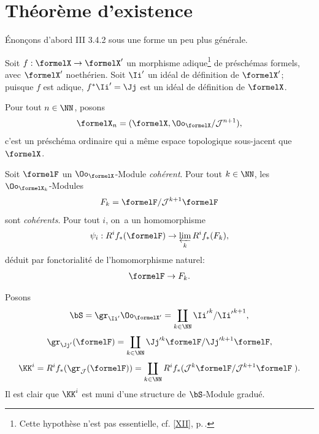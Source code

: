 \section{Th\'eor\`eme d'existence}

\'Enon\c cons d'abord \EGA III 3.4.2 sous une forme un peu plus
g\'en\'erale.

Soit $f:\formelX \to \formelX'$ un morphisme adique\footnote{Cette hypoth\`ese n'est pas essentielle, cf. \ref{XII}, p.\,\pageref{XII.14}.} de pr\'esch\'emas formels, avec $\formelX'$ noeth\'erien. Soit $\Ii'$ un id\'eal de d\'efinition de $\formelX'$; puisque $f$ est adique, $f^*\Ii'=\Jj$ est un id\'eal de d\'efinition de $\formelX$.

Pour tout $n\in \NN$, posons \label{IX.2}
\begin{equation} \label{eq:IX.2.1}
\formelX_n=(\formelX, \Oo_\formelX/{\Jb}^{n+1}),
\end{equation}
c'est un pr\'esch\'ema ordinaire qui a m\^eme espace topologique sous-jacent que $\formelX$.

Soit $\formelF$ un $\Oo_\formelX$-Module \emph{cohérent}. Pour tout $k\in\NN$, les $\Oo_{\formelX_k}$-Modules
\begin{equation} \label{eq:IX.2.2}
F_k=\formelF/{\Jb}^{k+1}\formelF
\end{equation}
sont \emph{cohérents}. Pour tout $i$, on~a un homomorphisme
\begin{equation} \label{eq:IX.2.3} \psi_i: R^if_*(\formelF) \to \varprojlim_k R^if_*(F_k),
\end{equation}
d\'eduit par fonctorialit\'e de l'homomorphisme naturel:
\begin{equation} \label{eq:IX.2.4} \formelF \to F_k.
\end{equation}

Posons
\begin{equation} \label{eq:IX.2.5}
\bS= \gr_{{\Ib}}\Oo_{\formelX'}=\coprod_{k \in \NN} {\Ib}^k/{\Ib}^{k+1},
\end{equation}
\begin{equation} \label{eq:IX.2.6} \gr_{\Jj'}(\formelF)=\coprod_{k \in \NN} \Jj'^k\formelF/\Jj'^{k+1}\formelF,
\end{equation}
\begin{equation} \label{eq:IX.2.7} \KK^i=R^if_*(\gr_{{\Jb}}(\formelF))=\coprod_{k \in \NN}R^if_* ({\Jb}^k \formelF/{\Jb}^{k+1}\formelF\;).
\end{equation}
Il est clair que $\KK^i$ est muni d'une structure de $\bS$-Module gradu\'e.

